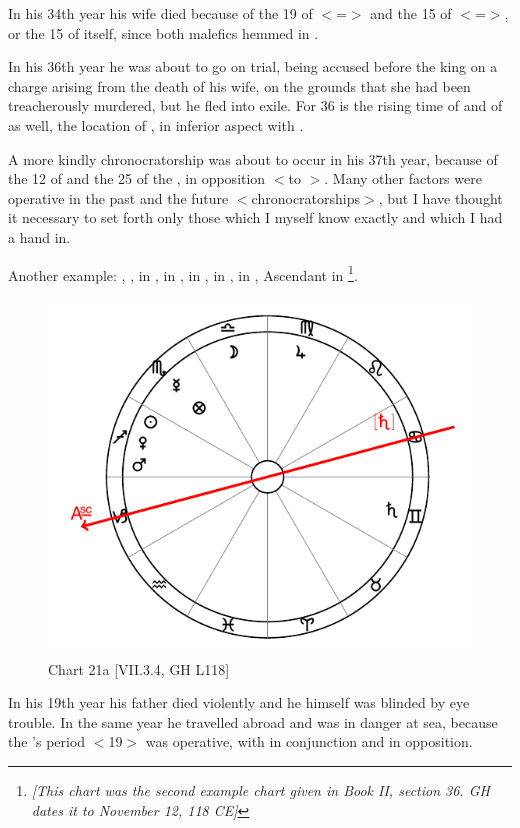 In his 34th year his wife died because of the 19 of \Leo\xspace $<$=\Sun$>$ and the 15 of \Scorpio\xspace $<$=\Mars$>$, or the 15 of \Mars\xspace itself, since both malefics hemmed in \Venus. 

In his 36th year he was about to go on trial, being accused before the king on a charge arising from the death of his wife, on the grounds that she had been treacherously murdered, but he fled into exile. For
36 is the rising time of \Leo\xspace and of \Scorpio\xspace as well, the location of \Venus, in inferior aspect with \Saturn. 

A more kindly chronocratorship was about to occur in his 37th year, because of the 12 of \Jupiter\xspace and the 25 of the \Moon, in opposition $<$to \Jupiter$>$. Many other factors were operative in the past and the future $<$chronocratorships$>$, but I have thought it necessary to set forth only those which I myself know exactly
and which I had a hand in.

\newpage
Another example: \Sun, \Mars, \Venus\xspace in \Sagittarius, \Moon\xspace in \Libra, \Saturn\xspace in \Gemini, \Jupiter\xspace in
\Virgo, \Mercury\xspace in \Scorpio, Ascendant in \Capricorn\footnote{\textit{[This chart was the second example chart given in Book II, section 36. GH dates it to November 12, 118 CE]}}.

\begin{figure}
\centering
\vspace{-20pt}
\includegraphics[width=.68\textwidth]{charts/2_36_2}
\caption{Chart 21a [VII.3.4, GH L118]}
\label{fig:chart21a}
\end{figure} 

In his 19th year his father died violently and he himself was blinded by eye trouble. In the same year he travelled abroad and was in danger at sea, because the \Sun’s period $<$19$>$ was operative, with \Mars\xspace in conjunction and \Saturn in opposition. 

